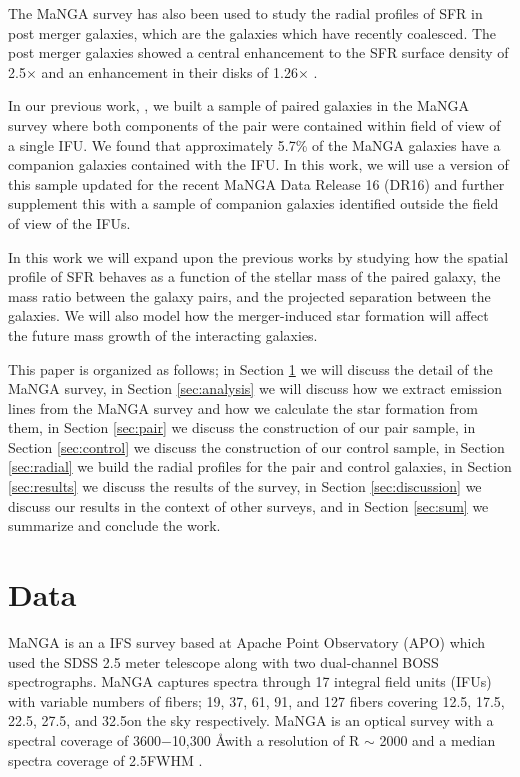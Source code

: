 \documentclass[iop,revtex4,twocolumn,apj,numberedappendix,appendixfloats]{emulateapj}
\begin{document}
The MaNGA survey has also been used to study the radial profiles of SFR in post merger galaxies, which are the galaxies which have recently coalesced. The post merger galaxies showed a central enhancement to the SFR surface density of 2.5$\times$ and an enhancement in their disks of 1.26$\times$ \citep{Thorp:2019}.

In our previous work, \citet{Fu:2018}, we built a sample of paired galaxies in the MaNGA survey where both components of the pair were contained within field of view of a single IFU. We found that approximately 5.7\% of the MaNGA galaxies have a companion galaxies contained with the IFU. In this work, we will use a version of this sample updated for the recent MaNGA Data Release 16 (DR16) and further supplement this with a sample of companion galaxies identified outside the field of view of the IFUs. 

In this work we will expand upon the previous works by studying how the spatial profile of SFR behaves as a function of the stellar mass of the paired galaxy, the mass ratio between the galaxy pairs, and the projected separation between the galaxies. We will also model how the merger-induced star formation will affect the future mass growth of the interacting galaxies. 

This paper is organized as follows; in Section \ref{sec:data} we will discuss the detail of the MaNGA survey, in Section \ref{sec:analysis} we will discuss how we extract emission lines from the MaNGA survey and how we calculate the star formation from them, in Section \ref{sec:pair} we discuss the construction of our pair sample, in Section \ref{sec:control} we discuss the construction of our control sample, in Section \ref{sec:radial} we build the radial profiles for the pair and control galaxies, in Section \ref{sec:results} we discuss the results of the survey, in Section \ref{sec:discussion} we discuss our results in the context of other surveys, and in Section \ref{sec:sum} we summarize and conclude the work. 

\section{Data}\label{sec:data}

MaNGA is an a IFS survey based at Apache Point Observatory (APO) which used the SDSS 2.5 meter telescope along with two dual-channel BOSS spectrographs. MaNGA captures spectra through 17 integral field units (IFUs) with variable numbers of fibers; 19, 37, 61, 91, and 127 fibers covering 12.5\arcsec, 17.5\arcsec, 22.5\arcsec, 27.5\arcsec, and 32.5\arcsec on the sky respectively. MaNGA is an optical survey with a spectral coverage of 3600$-$10,300 \AA with a resolution of R $\sim$ 2000 and a median spectra coverage of 2.5\arcsec FWHM \citep{Bundy:2015}. 
\end{document}

